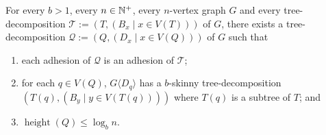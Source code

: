 \documentclass{patmorin}
\renewcommand{\le}{\leqslant}
\renewcommand{\leq}{\leqslant}
\newcommand{\piotr}[1]{\noindent\textcolor{red}{PiMi: #1}}
\newcommand{\torso}[2]{{#1}\langle{#2}\rangle}
\DeclareMathOperator{\height}{height}
\DeclareMathOperator{\depth}{depth}
\newcommand{\calQ}{\mathcal{Q}}
\newcommand{\calT}{\mathcal{T}}
\begin{document}
  \begin{cor}\label{b_skinny_decomp}
    For every $b>1$, every $n\in\mathbb{N}^+$, every $n$-vertex graph $G$ and every tree-decomposition $\calT:=(T,(B_x\mid x\in V(T)))$ of $G$, there exists a tree-decomposition $\calQ:=(Q,(D_x\mid x\in V(Q)))$ of $G$ such that
    \begin{enumerate}[nosep,nolistsep,label=\rm(\alph*)]
      \item\label{prop_adhesion}
      each adhesion of $\calQ$ is an adhesion of $\calT$;
      \item\label{prop_skinny_torso} for each $q\in V(Q)$, $\torso{G}{D_q}$ has a $b$-skinny tree-decomposition $(T(q), (B_y\mid y\in V(T(q))))$ where $T(q)$ is a subtree of $T$; and
      \item\label{prop_geometric} $\height(Q)\le \log_b n$.
    \end{enumerate}
  \end{cor}
\end{document}
